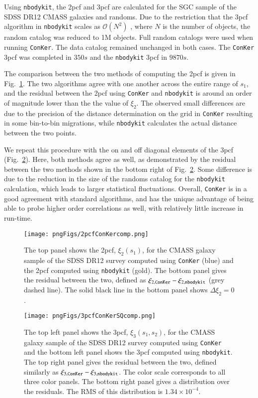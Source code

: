 \documentclass{aa}
\begin{document}
Using {\tt nbodykit}, the 2pcf and 3pcf are calculated for the SGC sample of the SDSS DR12 CMASS galaxies and randoms. Due to the restriction that the 3pcf algorithm in {\tt nbodykit} scales as $\mathcal{O}(N^2)$ \citep{Slepian:2015qza}, where $N$ is the number of objects, the random catalog was reduced to 1M objects. Full random catalogs were used when running {\tt ConKer}. The data catalog remained unchanged in both cases. The {\tt ConKer} 3pcf was completed in $350s$ and the {\tt nbodykit} 3pcf in $9870s$.

The comparison between the two methods of computing the 2pcf is given in Fig.~\ref{fig:comparison2pt}. The two algorithms agree with one another across the entire range of $s_1$, and the residual between the 2pcf using {\tt ConKer} and {\tt nbodykit} is around an order of magnitude lower than the the value of $\xi_2$. The observed small differences are due to the precision of the distance determination on the grid in {\tt ConKer} resulting in some bin-to-bin migrations, while {\tt nbodykit} calculates the actual distance between the two points. 

We repeat this procedure with the on and off diagonal elements of the 3pcf (Fig.~\ref{fig:comparison3pt}). Here, both methods agree as well, as demonstrated by the residual between the two methods shown in the bottom right of Fig.~\ref{fig:comparison3pt}. Some difference is due to the  reduction in the size of the randoms catalog for the {\tt nbodykit} calculation, which leads to larger statistical fluctuations. Overall, {\tt ConKer} is in a good agreement with standard algorithms, and has the unique advantage of being able to probe higher order correlations as well, with relatively little increase in run-time.

\begin{figure}
\texttt{[image: pngFigs/2pcfConKercomp.png]}
\caption{The top panel shows the 2pcf, $\xi_2(s_1)$, for the CMASS galaxy sample of the SDSS DR12 survey computed using {\tt ConKer} (blue) and the 2pcf computed using {\tt nbodykit} (gold). The bottom panel gives the residual between the two, defined as $\xi_{2,{\tt ConKer}} - \xi_{2,{\tt nbodykit}}$ (grey dashed line). The solid black line in the bottom panel shows $\Delta\xi_2 = 0$.}
\label{fig:comparison2pt}
\end{figure}

\begin{figure}
\texttt{[image: pngFigs/3pcfConKerSQcomp.png]}
\caption{The top left panel shows the 3pcf, $\xi_3(s_1,s_2)$, for the CMASS galaxy sample of the SDSS DR12 survey computed using {\tt ConKer} and the bottom left panel shows the 3pcf computed using {\tt nbodykit}. The top right panel gives the residual between the two, defined similarly as $\xi_{3,{\tt ConKer}} - \xi_{3,{\tt nbodykit}}$. The color scale corresponds to all three color panels. The bottom right panel gives a distribution over the residuals. The RMS of this distribution is  $1.34 \times 10^{-4}$.}
\label{fig:comparison3pt}
\end{figure}
\end{document}
